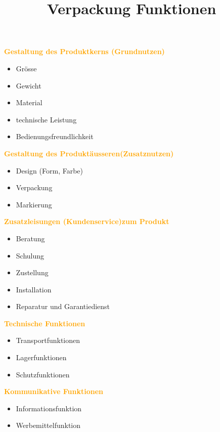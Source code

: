 \documentclass{article}
\begin{document}
\begin{multicols*}{3}
\textcolor {orange} {\textbf{Gestaltung des Produktkerns (Grundnutzen)}}
\begin{itemize}
	\item Grösse
	\item Gewicht
	\item Material
	\item technische Leistung
	\item Bedienungsfreundlichkeit
\end{itemize}


\columnbreak
\textcolor {orange} {\textbf{Gestaltung des Produktäusseren(Zusatznutzen)}}
\begin{itemize}
	\item Design (Form, Farbe)
	\item Verpackung
	\item Markierung
\end{itemize}

\columnbreak
\textcolor {orange} {\textbf{Zusatzleisungen (Kundenservice)zum Produkt}}
\begin{itemize}
	\item Beratung
	\item Schulung
	\item Zustellung
	\item Installation
	\item Reparatur und Garantiedienst
\end{itemize}




\end{multicols*}


\title{Verpackung Funktionen}

\begin{multicols*}{2}
\textcolor {orange} {\textbf{Technische Funktionen}}
\begin{itemize}
	\item Transportfunktionen
	\item Lagerfunktionen
	\item Schutzfunktionen
\end{itemize}


\columnbreak
\textcolor {orange} {\textbf{Kommunikative Funktionen}}

\begin{itemize}
	\item Informationsfunktion
	\item Werbemittelfunktion
	
\end{itemize}

\end{multicols*}
\end{document}
